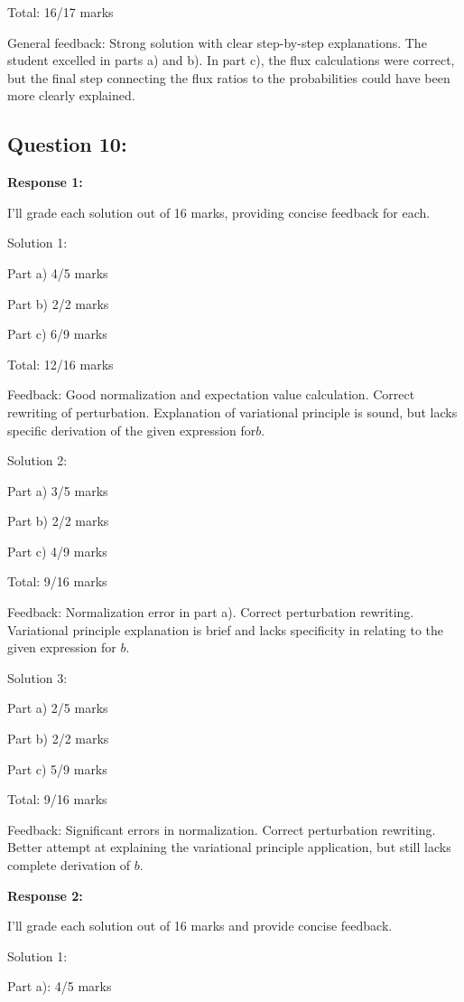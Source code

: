 \documentclass[a4paper,11pt]{article}
\begin{document}
Total: 16/17 marks

General feedback: Strong solution with clear step-by-step explanations. The student excelled in parts a) and b). In part c), the flux calculations were correct, but the final step connecting the flux ratios to the probabilities could have been more clearly explained.

\subsection*{Question 10:}

\textbf{Response 1:}

I'll grade each solution out of 16 marks, providing concise feedback for each.

Solution 1:

Part a) 4/5 marks

Part b) 2/2 marks

Part c) 6/9 marks

Total: 12/16 marks

Feedback: Good normalization and expectation value calculation. Correct rewriting of perturbation. Explanation of variational principle is sound, but lacks specific derivation of the given expression for\(b\).

Solution 2:

Part a) 3/5 marks

Part b) 2/2 marks

Part c) 4/9 marks

Total: 9/16 marks

Feedback: Normalization error in part a). Correct perturbation rewriting. Variational principle explanation is brief and lacks specificity in relating to the given expression for \(b\).

Solution 3:

Part a) 2/5 marks

Part b) 2/2 marks

Part c) 5/9 marks

Total: 9/16 marks

Feedback: Significant errors in normalization. Correct perturbation rewriting. Better attempt at explaining the variational principle application, but still lacks complete derivation of \(b\).

\bigskip
\textbf{Response 2:}

I'll grade each solution out of 16 marks and provide concise feedback.

Solution 1:

Part a): 4/5 marks
\end{document}
